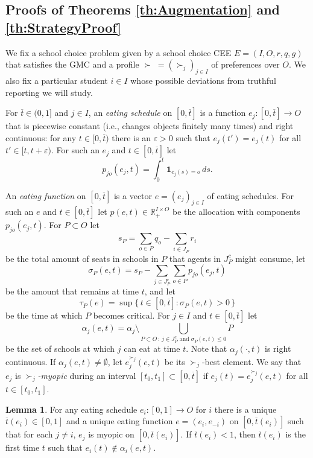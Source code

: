 \documentclass[12pt]{article}
\theoremstyle{definition}
\newtheorem{lem}{Lemma}
\renewcommand{\Re}{\mathbb{R}}
\newcommand{\bart}{{\overline t}}
\newcommand{\varep}{\varepsilon}
\newcommand{\bone}{\mathbf{1}}
\begin{document}
\begin{appendix}


\section{Proofs of Theorems \ref{th:Augmentation} and \ref{th:StrategyProof}} \label{app:StrategyProof}

We fix a school choice problem given by a school choice CEE $E = (I,O,r,q,g)$ that satisfies the GMC and a profile $\succ \; = (\succ_j)_{j \in I}$ of preferences over $O$.   We also fix a particular student $i \in I$ whose possible deviations from truthful reporting we will study.

For $\bart \in (0,1]$ and $j \in I$, an \emph{eating schedule} on $[0,\bart]$ is a function $e_j \colon [0,\bart] \to O$ 
that is  piecewise constant (i.e., changes objects finitely many times)  and right continuous: for any $t \in [0,\bart)$ there is an $\varep > 0$ such that $e_j(t') = e_j(t)$ for all $t' \in [t, t+\varep)$.  
For such an $e_j$ and $t \in [0,\bart]$ let
$$p_{jo}(e_j,t) = \int_0^t \bone_{e_j(s) = o} \, ds.$$

An \emph{eating function} on $[0,\bart]$ is a vector $e = (e_j)_{j \in I}$ of eating schedules.
For such an $e$ and $t \in [0,\bart]$ let $p(e,t) \in \Re_+^{I \times O}$ be the allocation with components $p_{jo}(e_j,t)$. For $P \subset O$ let $$s_P = \sum_{o \in P} q_o - \sum_{i \in J_P} r_i$$ be the total amount of seats in schools in $P$ that agents in $J_P^c$ might consume, let 
$$\sigma_P(e,t) = s_P  -  \sum_{j \in J_P^c} \sum_{o \in P} p_{jo}(e_j,t)$$ be the amount that remains at time $t$,
and let $$\tau_P(e) = \sup \{\, t \in [0,\bart] : \sigma_P(e,t) > 0 \,\}$$ be the time at which $P$ becomes critical.
For $j \in I$ and $t \in [0,\bart]$ let
$$\alpha_j(e,t) = \alpha_j  \setminus \bigcup_{P \subset O \, : \, \text{$j \in J_P^c$ and $\sigma_P(e,t) \le 0$}} P$$
be the set of schools at which $j$ can eat at time $t$.   Note that $\alpha_j(\cdot,t)$ is right continuous.
If $\alpha_j(e,t) \ne \emptyset$, let $e^{\succ_j}_j(e,t)$ be its $\succ_j$-best element.  We say that $e_j$ is \emph{$\succ_j$-myopic} during an interval $[t_0,t_1] \subset [0,\bart]$ if 
$e_j(t) = e^{\succ_j}_j(e,t)$ for all $t \in [t_0,t_1]$.

\begin{lem} \label{lemma:ExtendEat}
  For any eating schedule $e_i \colon [0,1] \to O$ for $i$ there is a unique $\bart(e_i) \in [0,1]$ and a unique eating function $e = (e_i,e_{-i})$ on $[0,\bart(e_i)]$ such that for each $j \ne i$, $e_j$ is myopic on $[0,\bart(e_i)]$.  If $\bart(e_i) < 1$, then $\bart(e_i)$ is the first time $t$ such that $e_i(t) \notin \alpha_i(e,t)$.
\end{lem}


\end{appendix}
\end{document}
